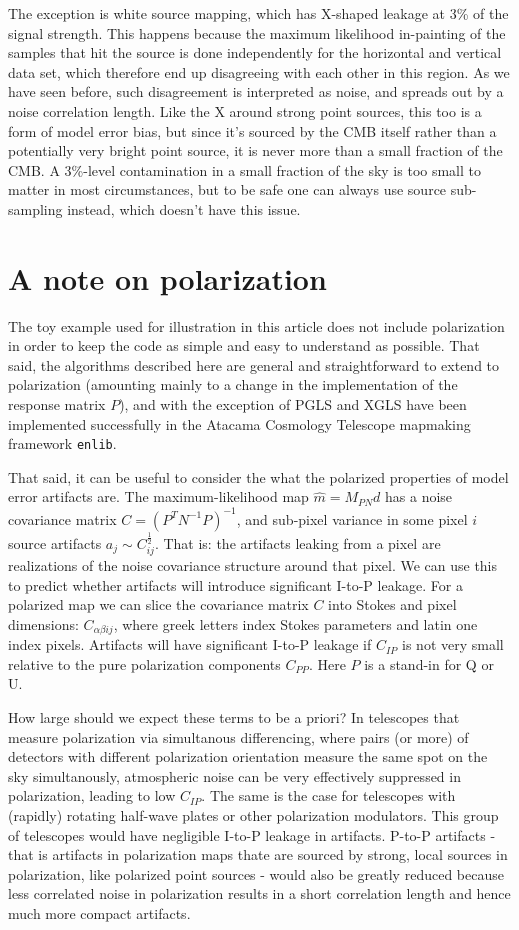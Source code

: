 \documentclass{article}
\newcommand{\code}[1]{\texttt{#1}}
\begin{document}
The exception is white
source mapping, which has X-shaped leakage at 3\% of the signal strength.
This happens because the
maximum likelihood in-painting of the samples that hit the source is done independently
for the horizontal and vertical data set, which therefore end up disagreeing with
each other in this region. As we have seen before, such disagreement is interpreted
as noise, and spreads out by a noise correlation length. Like the X around strong
point sources, this too is a form of model error bias, but since it's sourced by
the CMB itself rather than a potentially very bright point source, it is never
more than a small fraction of the CMB. A 3\%-level contamination in a small fraction
of the sky is too small to matter in most circumstances, but to be safe one can
always use source sub-sampling instead, which doesn't have this issue.

\section{A note on polarization}
The toy example used for illustration in this article does not include polarization
in order to keep the code as simple and easy to understand as possible. That said,
the algorithms described here are general and straightforward to extend to polarization
(amounting mainly to a change in the implementation of the response matrix $P$), and
with the exception of PGLS and XGLS have been implemented successfully in the Atacama
Cosmology Telescope mapmaking framework \code{enlib}.

That said, it can be useful to consider the what the polarized properties of model error
artifacts are. The maximum-likelihood map $\hat m = M_{PN} d$ has a noise covariance
matrix $C = (P^TN^{-1}P)^{-1}$, and sub-pixel variance in some pixel $i$ source artifacts
$a_j \sim C^{\frac12}_{ij}$. That is: the artifacts leaking from a pixel are realizations
of the noise covariance structure around that pixel. We can use this to predict whether
artifacts will introduce significant I-to-P leakage. For a polarized map we can slice the
covariance matrix $C$ into Stokes and pixel dimensions: $C_{\alpha\beta ij}$, where
greek letters index Stokes parameters and latin one index pixels. Artifacts will have
significant I-to-P leakage if $C_{IP}$ is not very small relative to the
pure polarization components $C_{PP}$. Here $P$ is a stand-in for Q or U.

How large should we expect these terms to be a priori? In telescopes that measure
polarization via simultanous differencing, where pairs (or more) of detectors with different
polarization orientation measure the same spot on the sky simultanously, atmospheric
noise can be very effectively suppressed in polarization, leading to low $C_{IP}$.
The same is the case for telescopes with (rapidly) rotating half-wave plates or other polarization
modulators. This group of telescopes would have negligible I-to-P leakage in artifacts.
P-to-P artifacts - that is artifacts in polarization maps thate are sourced by
strong, local sources in polarization, like polarized point sources - would also be
greatly reduced because less correlated noise in polarization results in a short
correlation length and hence much more compact artifacts.
\end{document}
